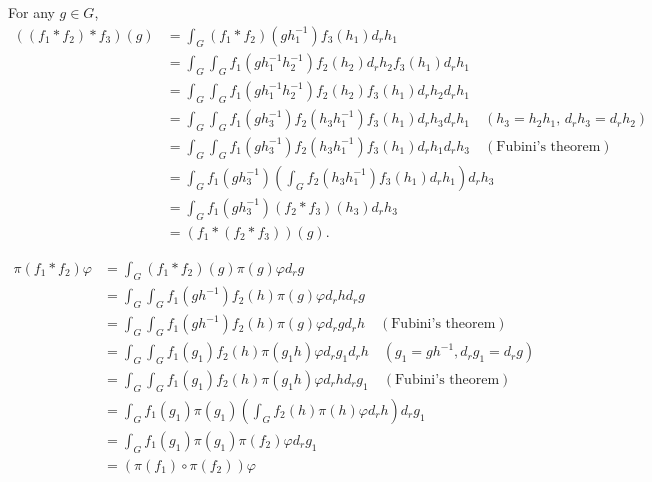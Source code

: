 \begin{problem}
For any $g \in G$,
\begin{align*}
    ((f_1 * f_2) * f_3)(g) &= \int_{G}(f_1 * f_2)(gh_1^{-1})f_{3}(h_{1})d_{r}h_{1} \\
    &= \int_{G} \int_{G} f_{1}(gh_{1}^{-1}h_{2}^{-1})f_{2}(h_{2})d_{r}h_{2}f_{3}(h_{1})d_{r}h_{1} \\
    &= \int_{G} \int_{G} f_{1}(gh_{1}^{-1}h_{2}^{-1})f_{2}(h_{2})f_{3}(h_{1}) d_{r}h_{2} d_{r}h_{1} \\
    &= \int_{G} \int_{G} f_{1}(gh_{3}^{-1})f_{2}(h_{3}h_{1}^{-1})f_{3}(h_{1}) d_{r}h_{3}d_{r}h_{1} \quad (h_{3} = h_{2}h_{1},\,d_{r}h_{3} = d_{r}h_{2}) \\
    &= \int_{G} \int_{G} f_{1}(gh_{3}^{-1})f_{2}(h_{3}h_{1}^{-1})f_{3}(h_{1}) d_{r}h_{1}d_{r}h_{3} \quad (\text{Fubini's theorem}) \\
    &= \int_{G} f_{1}(gh_{3}^{-1}) \left(\int_{G} f_{2}(h_{3}h_{1}^{-1})f_{3}(h_{1}) d_{r}h_{1}\right) d_{r}h_{3} \\
    &= \int_{G} f_{1}(gh_{3}^{-1}) (f_{2} * f_{3})(h_{3})d_{r}h_{3} \\
    &= (f_{1} * (f_{2} * f_{3}))(g).
\end{align*}
\end{problem}

\begin{problem} \notfinish
\end{problem}

\begin{problem}
\begin{align*}
    \pi(f_1 * f_2)\varphi &= \int_G (f_1 * f_2)(g) \pi(g) \varphi d_{r}g \\
    &= \int_G \int_G f_1(gh^{-1})f_{2}(h)\pi(g)\varphi d_{r}h d_{r}g \\
    &= \int_G \int_G f_1(gh^{-1})f_{2}(h)\pi(g)\varphi d_{r}g d_{r}h \quad (\text{Fubini's theorem}) \\
    &= \int_G \int_G f_{1}(g_{1})f_{2}(h)\pi(g_{1}h)\varphi d_{r}g_{1} d_{r}h\quad (g_1 = gh^{-1}, d_{r}g_1 = d_{r}g) \\
    &= \int_G \int_G f_{1}(g_{1})f_{2}(h)\pi(g_{1}h)\varphi d_{r}h d_{r}g_1\quad (\text{Fubini's theorem}) \\
    &= \int_G f_1(g_1) \pi(g_1) \left(\int_G f_2(h)\pi(h)\varphi d_{r}h \right)d_{r}g_{1} \\
    &= \int_G f_1(g_1) \pi(g_1) \pi(f_2)\varphi d_{r}g_1 \\
    &= (\pi(f_1) \circ \pi(f_2))\varphi
\end{align*}
\end{problem}
